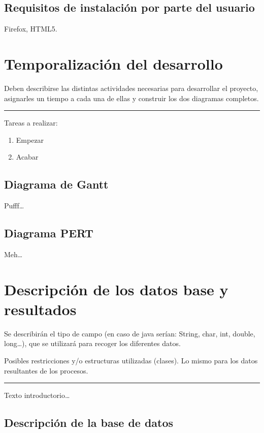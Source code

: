 \documentclass[12pt,a4paper,titlepage]{article}
\begin{document}
    \subsection{Requisitos de instalación por parte del usuario}

    Firefox, HTML5.

    \section{Temporalización del desarrollo}

    Deben describirse las distintas actividades necesarias para desarrollar el proyecto, asignarles un tiempo a cada una de ellas y construir los dos diagramas completos.

    \bigskip\hrule\bigskip

    Tareas a realizar:

    \begin{enumerate}
        \item Empezar
        \item Acabar
    \end{enumerate}

    \subsection{Diagrama de Gantt}

    Pufff\dots

    \subsection{Diagrama PERT}

    Meh\dots

    \section{Descripción de los datos base y resultados}

    Se describirán el tipo de campo (en caso de java serían: String, char, int, double, long\dots), que se utilizará para recoger los diferentes datos.

    Posibles restricciones y/o estructuras utilizadas (clases). Lo mismo para los datos resultantes de los procesos.

    \bigskip\hrule\bigskip

    Texto introductorio\dots

    \subsection{Descripción de la base de datos}
\end{document}
